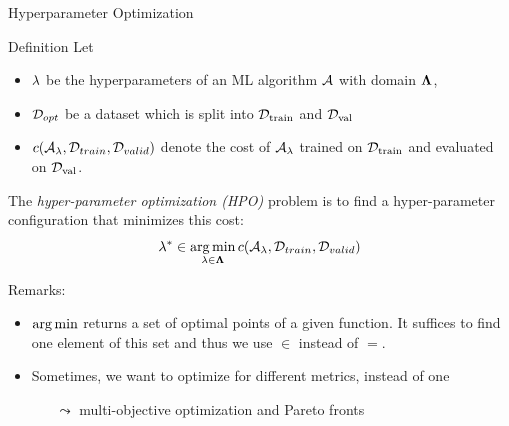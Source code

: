 \begin{frame}[c]{Hyperparameter Optimization}

\begin{block}{Definition}
	Let 
	\begin{itemize}
		\item $\mathbf{\lambda}$ be the hyperparameters of an ML algorithm $\mathcal{A}$ with domain $\mathbf{\Lambda}$,
		\pause
		\item $\mathcal{D}_{opt}$ be a dataset which is split into $\mathcal{D}_{\text{train}}$ and $\mathcal{D}_{\text{val}}$ 
		\pause
		\item $c(\mathcal{A}_{\mathbf{\lambda}}, \mathcal{D}_{train}, \mathcal{D}_{valid})$ denote the cost of $\mathcal{A}_{\mathbf{\lambda}}$ trained on $\mathcal{D}_{\text{train}}$ and evaluated on $\mathcal{D}_{\text{val}}$.
	\end{itemize}
	\pause
	The \emph{hyper-parameter optimization (HPO)} problem is to find a hyper-parameter configuration that minimizes this cost:
	\begin{equation}
	\mathbf{\lambda}^* \in \operatorname*{arg\,min}_{\mathbf{\lambda} \in \mathbf{\Lambda}} c(\mathcal{A}_{\mathbf{\lambda}}, \mathcal{D}_{train}, \mathcal{D}_{valid}) \nonumber  
	\end{equation}
\end{block}

\pause
Remarks: 

\begin{itemize}
	\item $\operatorname*{arg\,min}$ returns a set of optimal points of a given function. It suffices to find one element of this set and thus we use $\in$ instead of $=$.
	\pause
	\item Sometimes, we want to optimize for different metrics, instead of one
	\begin{itemize}
		\item[$\leadsto$] multi-objective optimization and Pareto fronts
	\end{itemize}
\end{itemize}

\end{frame}
